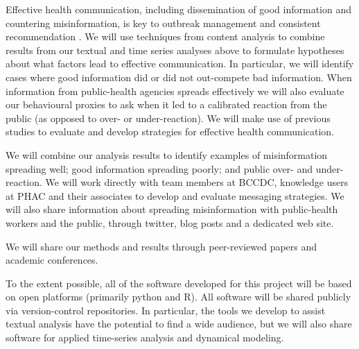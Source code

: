 
Effective health communication, including dissemination of good information and countering misinformation, is key to outbreak management \citep{SongSong17} and consistent recommendation \citep{OhlrSugg18,SongSong17}.
We will use techniques from content analysis \citep{Finf13 ,Mayr14} to combine results from our textual and time series analyses above to formulate hypotheses about what factors lead to effective communication. In particular, we will identify cases where good information did or did not out-compete bad information. When information from public-health agencies spreads effectively we will also evaluate our behavioural proxies to ask when it led to a calibrated reaction from the public (as opposed to over- or under-reaction).
We will make use of previous studies to evaluate \citep{Ding14,FarmSher18,NowaShee15,Tam18} and develop \citep{BekaBigm18, ShenShee15, SongSong17} strategies for effective health communication.


 We will combine our analysis results to identify examples of misinformation spreading well; good information spreading poorly; and public over- and under-reaction. We will work directly with team members at BCCDC, knowledge users at PHAC and their associates to develop and evaluate messaging strategies. We will also share information about spreading misinformation with public-health workers and the public, through twitter, blog posts and a dedicated web site. 

 We will share our methods and results through peer-reviewed papers and academic conferences. 

 To the extent possible, all of the software developed for this project will be based on open platforms (primarily python and R). All software will be shared publicly via version-control repositories. In particular, the tools we develop to assist textual analysis have the potential to find a wide audience, but we will also share software for applied time-series analysis and dynamical modeling.


